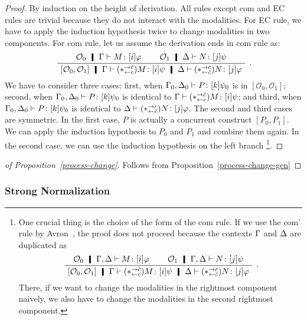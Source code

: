 {  \begin{proposition}
   \label{process-change-gen}
  \end{proposition}
  \begin{proof}
   By induction on the height of derivation.
   All rules except com and EC rules are trivial because they do not interact
   with the modalities.  For EC rule, we have to apply the induction
   hypothesis twice to change modalities in two components.  For com rule,
   let us assume the derivation ends in com rule as:
   \[
   \BinaryRule
   {$\hypert_0\hmid\G\tr\tj{M}{[i]\varphi}$}
   {$\hypert_1\hmid\D\tr\tj{N}{[j]\psi}$}
   {}
   {$\cotuple{\hypert_0,\hypert_1}\hmid\Gamma\tr\tj{(\comodL)M}{[i]\psi}\hmid
   \Delta\tr\tj{(\comodR)N}{[j]\varphi}$}\enspace.
   \]
   We have to consider three cases:  first, when
   $\Gamma_0,\Delta_0\vdash{P} \colon{[k]\psi_0}$ is in $[\mathcal O_0, \mathcal O_1]$;
   second, when $\Gamma_0,\Delta_0\vdash{P} \colon{[k]\psi_0}$ is identical to
   $ \Gamma\vdash{(\ast^{\rightarrow {\bar{c}}}_{\leftarrow{c}})M} \colon{[i]\psi} $; and third,
   when $\Gamma_0,\Delta_0\vdash{P} \colon{[k]\psi_0}$ is identical to
   $\Delta\vdash{(\ast^{\rightarrow {c}}_{\leftarrow{\bar{c}}})N} \colon{[j]\varphi}$.
   The second and third cases are symmetric.  In the first case, $P$ is
   actually a concurrent construct $[P_0,P_1]$. We can apply the
   induction hypothesis to $P_0$ and $P_1$ and combine them again.
   In the second case, we can use the induction hypothesis on the left branch%
   \footnote{One crucial thing is the choice of the form of the com rule.
   If we use the com' rule by Avron~\cite{avron91}, the proof does not
   proceed because the contexts $\Gamma$ and $\Delta$ are duplicated as
   \[
   \BinaryRule
   {$\hypert_0\hmid\G,\D\tr\tj{M}{[i]\varphi}$}
   {$\hypert_1\hmid\G,\D\tr\tj{N}{[j]\psi}$}
   {}
   {$\cotuple{\hypert_0,\hypert_1}\hmid\G\tr\tj{(\comodL)M}{[i]\psi}\hmid
   \D\tr\tj{(\comodR)N}{[j]\varphi}$}\enspace.
   \]
   There, if we want to change the modalities in the rightmost component
   naively, we also have to change the modalities in the second
   rightmost component.
   }.
  \end{proof}

 \begin{proof}[of Proposition~\ref{process-change}]
  Follows from Proposition~\ref{process-change-gen}
 \end{proof}

\subsubsection{Strong Normalization}
\newcommand{\sreduce}{\leadsto}

}

